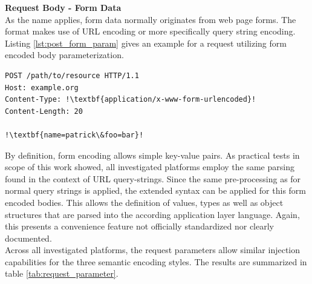 \textbf{Request Body - Form Data}\\
As the name applies, form data normally originates from web page forms. The format makes use of URL encoding or more specifically query string encoding. Listing \ref{lst:post_form_param} gives an example for a request utilizing form encoded body parameterization. \\

\begin{lstlisting}[escapechar=!, caption={Example for POST request with form encoded body parameterization}, label={lst:post_form_param}]
POST /path/to/resource HTTP/1.1
Host: example.org
Content-Type: !\textbf{application/x-www-form-urlencoded}!
Content-Length: 20

!\textbf{name=patrick\&foo=bar}!
\end{lstlisting}

By definition, form encoding allows simple key-value pairs. As practical tests in scope of this work showed, all investigated platforms employ the same parsing found in the context of URL query-strings. Since the same pre-processing as for normal query strings is applied, the extended syntax can be applied for this form encoded bodies. This allows the definition of values, types as well as object structures that are parsed into the according application layer language. Again, this presents a convenience feature not officially standardized nor clearly documented.\\

Across all investigated platforms, the request parameters allow similar injection capabilities for the three semantic encoding styles. The results are summarized in table \ref{tab:request_parameter}.

